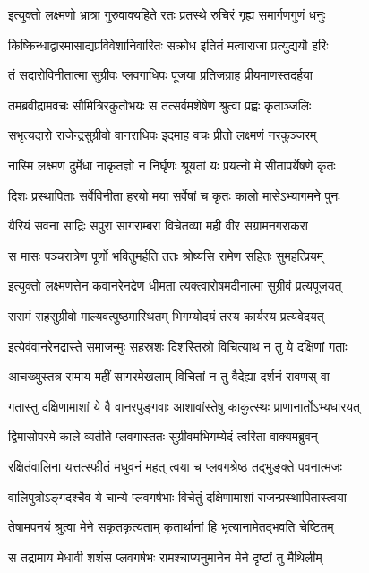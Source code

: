 \twolineshloka
{इत्युक्तो लक्ष्मणो भ्रात्रा गुरुवाक्यहिते रतः}
{प्रतस्थे रुचिरं गृह्य समार्गणगुणं धनुः}


\twolineshloka
{किष्किन्धाद्वारमासाद्यप्रविवेशानिवारितः}
{सक्रोध इतितं मत्वाराजा प्रत्युद्ययौ हरिः}


\twolineshloka
{तं सदारोविनीतात्मा सुग्रीवः प्लवगाधिपः}
{पूजया प्रतिजग्राह प्रीयमाणस्तदर्हया}


\twolineshloka
{तमब्रवीद्रामवचः सौमित्रिरकुतोभयः}
{स तत्सर्वमशेषेण श्रुत्वा प्रह्वः कृताञ्जलिः}


\twolineshloka
{सभृत्यदारो राजेन्द्रसुग्रीवो वानराधिपः}
{इदमाह वचः प्रीतो लक्ष्मणं नरकुञ्जरम्}


\twolineshloka
{नास्मि लक्ष्मण दुर्मेधा नाकृतज्ञो न निर्घृणः}
{श्रूयतां यः प्रयत्नो मे सीतापर्येषणे कृतः}


\twolineshloka
{दिशः प्रस्थापिताः सर्वेविनीता हरयो मया}
{सर्वेषां च कृतः कालो मासेऽभ्यागमने पुनः}


\twolineshloka
{यैरियं सवना साद्रिः सपुरा सागराम्बरा}
{विचेतव्या मही वीर सग्रामनगराकरा}


\twolineshloka
{स मासः पञ्चरात्रेण पूर्णो भवितुमर्हति}
{ततः श्रोष्यसि रामेण सहितः सुमहत्प्रियम्}


\twolineshloka
{इत्युक्तो लक्ष्मणत्तेन कवानरेनद्रेण धीमता}
{त्यक्त्वारोषमदीनात्मा सुग्रीवं प्रत्यपूजयत्}


\twolineshloka
{सरामं सहसुग्रीवो माल्यवत्पुष्ठमास्थितम्}
{भिगम्योदयं तस्य कार्यस्य प्रत्यवेदयत्}


\twolineshloka
{इत्येवंवानरेनद्रास्ते समाजन्मुः सहस्रशः}
{दिशस्तिस्रो विचित्याथ न तु ये दक्षिणां गताः}


\twolineshloka
{आचख्युस्तत्र रामाय महीं सागरमेखलाम्}
{विचितां न तु वैदेह्या दर्शनं रावणस् वा}


\twolineshloka
{गतास्तु दक्षिणामाशां ये वै वानरपुङ्गवाः}
{आशावांस्तेषु काकुत्स्थः प्राणानार्तोऽभ्यधारयत्}


\twolineshloka
{द्विमासोपरमे काले व्यतीते प्लवगास्ततः}
{सुग्रीवमभिगम्येदं त्वरिता वाक्यमब्रुवन्}


\twolineshloka
{रक्षितंवालिना यत्तत्स्फीतं मधुवनं महत्}
{त्वया च प्लवगश्रेष्ठ तद्भुङ्क्ते पवनात्मजः}


\twolineshloka
{वालिपुत्रोऽङ्गदश्चैव ये चान्ये प्लवगर्षभाः}
{विचेतुं दक्षिणामाशां राजन्प्रस्थापितास्त्वया}


\twolineshloka
{तेषामपनयं श्रुत्वा मेने सकृतकृत्यताम्}
{कृतार्थानां हि भृत्यानामेतद्भवति चेष्टितम्}


\twolineshloka
{स तद्रामाय मेधावी शशंस प्लवगर्षभः}
{रामश्चाप्यनुमानेन मेने दृष्टां तु मैथिलीम्}



